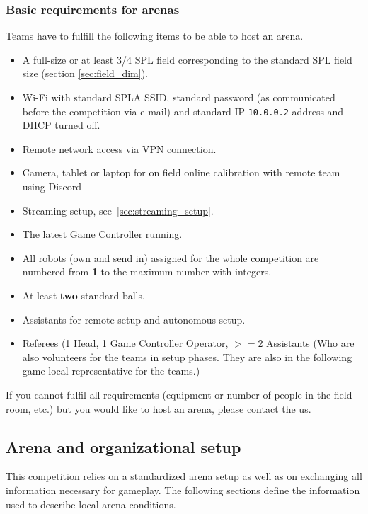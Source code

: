 \subsubsection{Basic requirements for arenas}
\label{sec:c3_BasicRequirementsForArenas}
Teams have to fulfill the following items to be able to host an arena.

\begin{itemize}
    \item A full-size or at least 3/4 SPL field corresponding to the standard SPL field size (\cf section \ref{sec:field_dim}).
	\item Wi-Fi with standard SPL\textunderscore A SSID, standard password (as communicated before the competition via e-mail) and standard IP \texttt{10.0.0.2} address and DHCP turned off.
    \item Remote network access via VPN connection.
    \item Camera, tablet or laptop for on field online calibration with remote team using Discord
    \item Streaming setup, see~\ref{sec:streaming_setup}.
	\item The latest Game Controller running.
    \item All robots (own and send in) assigned for the whole competition are numbered from \textbf{1} to the maximum number with integers.
    \item At least \textbf{two} standard balls.
    \item Assistants for remote setup and autonomous setup.
    \item Referees (1 Head, 1 Game Controller Operator, $>= 2$ Assistants (Who are also volunteers for the teams in setup phases. They are also in the following game local representative for the teams.)
\end{itemize}

If you cannot fulfil all requirements (equipment or number of people in the field room, etc.) but you would like to host an arena, please contact the us.

\subsection{Arena and organizational setup}
\label{sec:arean-org-setup}
This competition relies on a standardized arena setup as well as on exchanging all information necessary for gameplay. The following sections define the information used to describe local arena conditions.


